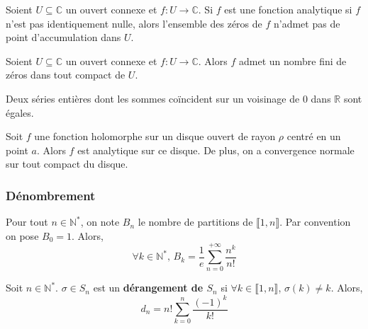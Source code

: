	\begin{theorem}
		Soient $U \subseteq \mathbb{C}$ un ouvert connexe et $f : U \rightarrow \mathbb{C}$. Si $f$ est une fonction analytique si $f$ n'est pas identiquement nulle, alors l'ensemble des zéros de $f$ n'admet pas de point d'accumulation dans $U$.
	\end{theorem}

	\begin{corollary}
		Soient $U \subseteq \mathbb{C}$ un ouvert connexe et $f : U \rightarrow \mathbb{C}$. Alors $f$ admet un nombre fini de zéros dans tout compact de $U$.
	\end{corollary}


	\begin{corollary}
		Deux séries entières dont les sommes coïncident sur un voisinage de $0$ dans $\mathbb{R}$ sont égales.
	\end{corollary}


	\begin{theorem}
		Soit $f$ une fonction holomorphe sur un disque ouvert de rayon $\rho$ centré en un point $a$. Alors $f$ est analytique sur ce disque.
		De plus, on a convergence normale sur tout compact du disque.
	\end{theorem}

	\subsubsection{Dénombrement}


	\begin{application}
		Pour tout $n \in \mathbb{N}^*$, on note $B_n$ le nombre de partitions de $\llbracket 1, n \rrbracket$. Par convention on pose $B_0 = 1$. Alors,
		\[ \forall k \in \mathbb{N}^*, \, B_k = \frac{1}{e} \sum_{n=0}^{+\infty} \frac{n^k}{n!} \]
	\end{application}


	\begin{application}
		Soit $n \in \mathbb{N}^*$. $\sigma \in S_n$ est un \textbf{dérangement de $S_n$} si $\forall k \in \llbracket 1, n \rrbracket$, $\sigma(k) \neq k$.
		Alors,
		\[ d_n = n! \sum_{k=0}^n \frac{(-1)^k}{k!} \]
	\end{application}

